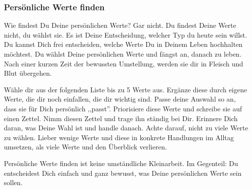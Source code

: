 \documentclass[../Lebensziel.tex]{subfiles}
\begin{document}
\subsubsection{Persönliche Werte finden}
Wie findest Du Deine persönlichen Werte? Gar nicht. Du findest Deine Werte nicht, du wählst sie. Es ist Deine Entscheidung, welcher Typ du heute sein willst. Du kannst Dich frei entscheiden, welche Werte Du in Deinem Leben hochhalten möchtest. Du wählst Deine persönlichen Werte und fängst an, danach zu leben. Nach einer kurzen Zeit der bewussten Umstellung, werden sie dir in Fleisch und Blut übergehen.

Wähle dir aus der folgenden Liste bis zu 5 Werte aus. Ergänze diese durch eigene Werte, die dir noch einfallen, die dir wichtig sind. Passe deine Auswahl so an, dass sie für Dich persönlich ,,passt''. Priorisiere diese Werte und schreibe sie auf einen Zettel. Nimm diesen Zettel und trage ihn ständig bei Dir. Erinnere Dich daran, was Deine Wahl ist und handle danach. Achte darauf, nicht zu viele Werte zu wählen. Lieber wenige Werte und diese in konkrete Handlungen im Alltag umsetzen, als viele Werte und den Überblick verlieren.

Persönliche Werte finden ist keine umständliche Kleinarbeit. Im Gegenteil: Du entscheidest Dich einfach und ganz bewusst, was Deine persönlichen Werte sein sollen.
\end{document}
